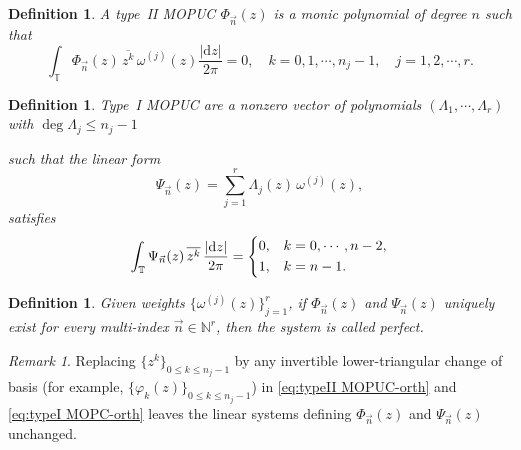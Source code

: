 \documentclass[a4paper,10pt,leqno]{amsart}
\numberwithin{equation}{section}
\newtheorem{definition}[theorem]{Definition}
\theoremstyle{remark}
\newtheorem{remark}{Remark}
\newcommand{\dd}{\mathrm{d}}
\newcommand{\N}{\mathbb{N}}
\newcommand{\TT}{\mathbb{T}}
\newcommand{\ip}[2]{\langle #1, #2 \rangle}
\newcommand{\red}[1]{{\color{red} #1}}
\begin{document}
\begin{definition}\label{def:typeII MOPUC}
A type~II MOPUC $\Phi_{\vec{n}}(z)$ is a monic polynomial of degree $n$ such that
\begin{equation} \label{eq:typeII MOPUC-orth}
\int_{\TT} \Phi_{\vec{n}}(z) \, \overline{z^k} \, \omega^{(j)}(z) \frac{|\dd z|}{2\pi} = 0,
\quad k=0,1,\cdots,n_j-1, \quad j=1,2,\cdots,r.
\end{equation}
\end{definition}

\begin{definition}\label{def:typeI MOPUC}
Type~I MOPUC are a nonzero vector of polynomials $(\Lambda_{1}, \cdots, \Lambda_{r})$ with $\deg \Lambda_{j} \leq n_j - 1$ 

such that the linear form
\begin{equation} \label{eq:typeIMOPC-linearform}
\Psi_{\vec{n}}(z) = \sum_{j=1}^r \Lambda_{j}(z) \,  \omega^{(j)}(z),
\end{equation}
satisfies
\begin{align}
\int_{\TT} \Psi_{\vec{n}}(z) \, \overline{z^k} \, \frac{|\dd z|}{2\pi} = \begin{dcases}
    0, & k = 0, \cdots, n-2,\\
    1, & k = n-1.
\end{dcases}\label{eq:typeI MOPC-orth}
\end{align}
\end{definition}

\begin{definition} \label{def:normalperfect}
Given weights $\{\omega^{(j)}(z)\}_{j=1}^r$, if $\Phi_{\vec{n}}(z)$ and $\Psi_{\vec{n}}(z)$ uniquely exist for every multi-index $\vec{n} \in \N^r$, then the system is called perfect.
\end{definition}

\begin{remark} \label{rem 1}
Replacing $\{z^k\}_{0\le k\le n_j-1}$ by any invertible lower-triangular change of basis (for example, $\{\varphi_k(z)\}_{0 \leq k\le n_j-1}$) in \eqref{eq:typeII MOPUC-orth} and \eqref{eq:typeI MOPC-orth} leaves the linear systems defining $\Phi_{\vec{n}}(z)$ and $\Psi_{\vec{n}}(z)$ unchanged.
\end{remark}
\end{document}
